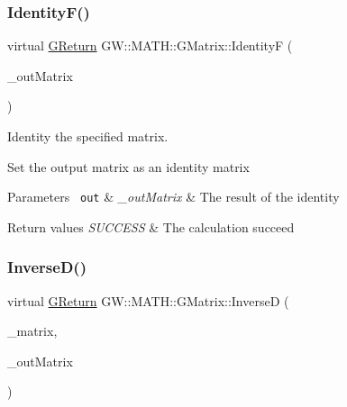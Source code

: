 \subsubsection{\texorpdfstring{IdentityF()}{IdentityF()}}
{\footnotesize\ttfamily virtual \mbox{\hyperlink{namespaceGW_a67a839e3df7ea8a5c5686613a7a3de21}{G\+Return}} G\+W\+::\+M\+A\+T\+H\+::\+G\+Matrix\+::\+IdentityF (\begin{DoxyParamCaption}\item[{\mbox{\hyperlink{structGW_1_1MATH_1_1GMATRIXF}{G\+M\+A\+T\+R\+I\+XF}} \&}]{\+\_\+out\+Matrix }\end{DoxyParamCaption})\hspace{0.3cm}{\ttfamily [pure virtual]}}



Identity the specified matrix. 

Set the output matrix as an identity matrix


\begin{DoxyParams}[1]{Parameters}
\mbox{\texttt{ out}}  & {\em \+\_\+out\+Matrix} & The result of the identity\\
\hline
\end{DoxyParams}

\begin{DoxyRetVals}{Return values}
{\em S\+U\+C\+C\+E\+SS} & The calculation succeed \\
\hline
\end{DoxyRetVals}
\mbox{\label{classGW_1_1MATH_1_1GMatrix_ade39ff1c70cb06889196893aad819244}} 
\subsubsection{\texorpdfstring{InverseD()}{InverseD()}}
{\footnotesize\ttfamily virtual \mbox{\hyperlink{namespaceGW_a67a839e3df7ea8a5c5686613a7a3de21}{G\+Return}} G\+W\+::\+M\+A\+T\+H\+::\+G\+Matrix\+::\+InverseD (\begin{DoxyParamCaption}\item[{\mbox{\hyperlink{structGW_1_1MATH_1_1GMATRIXD}{G\+M\+A\+T\+R\+I\+XD}}}]{\+\_\+matrix,  }\item[{\mbox{\hyperlink{structGW_1_1MATH_1_1GMATRIXD}{G\+M\+A\+T\+R\+I\+XD}} \&}]{\+\_\+out\+Matrix }\end{DoxyParamCaption})\hspace{0.3cm}{\ttfamily [pure virtual]}}



